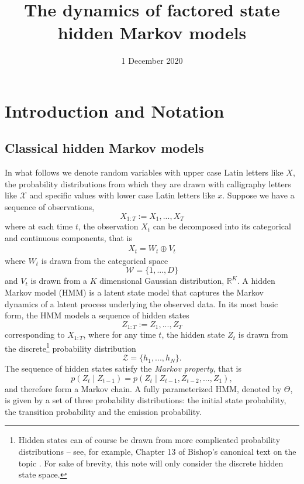 \documentclass{amsart}
\title{The dynamics of factored state hidden Markov models}
\date{1 December 2020}
\begin{document}
\maketitle

\section{Introduction and Notation}\label{sec:intro}

\subsection{Classical hidden Markov models}
In what follows we denote random variables with upper case Latin letters like 
$X$, the probability distributions from which they are drawn with calligraphy 
letters like $\mathcal X$ and specific values with lower case Latin letters like $x$.  Suppose we have a sequence of observations, 
\[
X_{1:T} := X_1,...,X_T
\]
where at each time $t$, the observation $X_t$ can be decomposed into its 
categorical and continuous components, that is 
\begin{eqnarray}\label{eqn:decomposition}
X_t = W_t\oplus V_t
\end{eqnarray}
where $W_{t}$ is drawn from the categorical space
\[ 
\mathcal W = \{1,...,D\}
\]
and $V_t$ is drawn from a $K$ dimensional Gaussian distribution, $\mathbb R^K$.
A hidden Markov model (HMM) is a latent state model that captures the Markov dynamics of a latent process underlying the observed data.  In its most basic form, the HMM models a sequence of hidden states
\[
Z_{1:T} := Z_1,...,Z_T
\]
corresponding to $X_{1:T}$, where for any time $t$, the hidden state $Z_t$ is 
drawn from the discrete\footnote{Hidden states can of course be drawn from more complicated probability 
distributions -- see, for example, Chapter 13 of Bishop's canonical text on the 
topic \cite{B06}.  For sake of brevity, this note will only 
consider the discrete hidden state space.} probability distribution
\[
\mathcal{Z} = \{h_1,...,h_N\}.
\]
The sequence of hidden states satisfy the {\em Markov property}, that is 
\[
p(Z_t\mid Z_{t-1})=p(Z_t\mid Z_{t-1},Z_{t-2},...,Z_1),
\]
and therefore form a Markov chain.  A fully parameterized HMM, denoted by 
$\Theta$, is given by a set of three probability distributions: the initial state probability, the transition probability and the 
emission probability.
\end{document}

